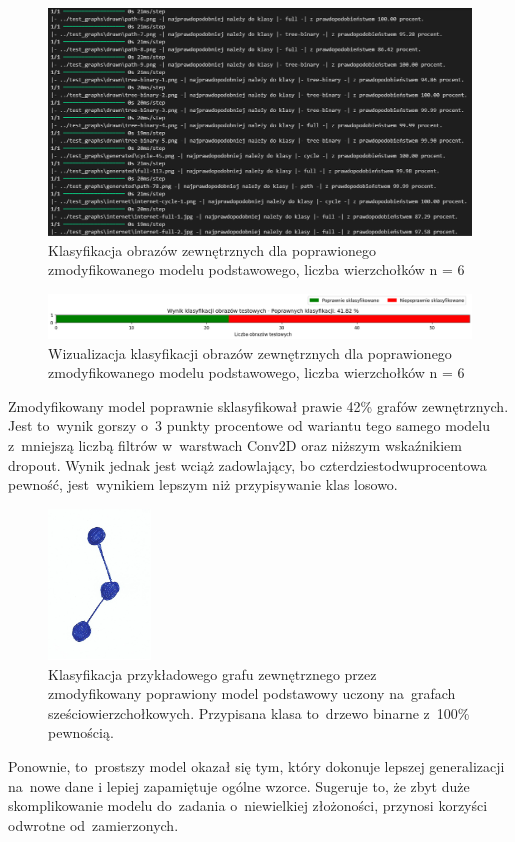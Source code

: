 \begin{figure}[ht]
	\centering
	\includegraphics[width=15.5cm]{resources/tests/images/v4/base6_1_1_txt.png}
	\caption{Klasyfikacja obrazów zewnętrznych dla poprawionego zmodyfikowanego modelu podstawowego, liczba wierzchołków n = 6}
	\label{Fig:tests-best-2b}
\end{figure}
\FloatBarrier

\begin{figure}[ht]
	\centering
	\includegraphics[width=15.5cm]{resources/tests/images/v4/base6_1_1_bar.png}
	\caption{Wizualizacja klasyfikacji obrazów zewnętrznych dla poprawionego zmodyfikowanego modelu podstawowego, liczba wierzchołków n = 6}
	\label{Fig:tests-best-1c}
\end{figure}
\FloatBarrier

Zmodyfikowany model poprawnie sklasyfikował prawie 42\% grafów zewnętrznych.
Jest to~wynik gorszy o~3 punkty procentowe od wariantu tego samego modelu
z~mniejszą liczbą filtrów w~warstwach Conv2D oraz niższym wskaźnikiem dropout.
Wynik jednak jest wciąż zadowlający, bo czterdziestodwuprocentowa pewność,
jest~wynikiem lepszym niż przypisywanie klas losowo.

\begin{figure}[ht]
	\centering
	\includegraphics[height=4cm]{../graph_classification/test_graphs/drawn/path-4.png}
	\caption{Klasyfikacja przykładowego grafu zewnętrznego przez zmodyfikowany poprawiony model podstawowy
		uczony na~grafach sześciowierzchołkowych.
		Przypisana klasa to~drzewo binarne z~100\% pewnością.}
	\label{Fig:tests-best-1d}
\end{figure}
\FloatBarrier

Ponownie, to~prostszy model okazał się tym, który dokonuje lepszej generalizacji na~nowe dane
i lepiej zapamiętuje ogólne wzorce.
Sugeruje to, że zbyt duże skomplikowanie modelu do~zadania o~niewielkiej złożoności,
przynosi korzyści odwrotne od~zamierzonych.
